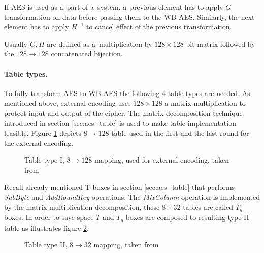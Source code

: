 \documentclass[11pt,oneside,final]{fithesis2}
\begin{document}
    If AES is used as a~part of a~system, a~previous element has to apply $G$ transformation on data before passing them to the WB AES. Similarly, the next element has to apply
    $H^{-1}$ to cancel effect of the previous transformation. 
    
    Usually $G, H$ are defined as a~multiplication by $128\times128$-bit matrix followed by the $128 \rightarrow 128$ concatenated bijection. 

    
    \paragraph*{Table types.} To fully transform AES to WB AES the following 4 table types are needed.
    As mentioned above, external encoding uses $128\times128$ a matrix multiplication to protect input and output of the cipher. 
    The matrix decomposition technique introduced in section \ref{sec:aes_table} is used to make table implementation feasible. Figure \ref{fig:aes_t1} depicts
    $8\rightarrow128$ table used in the first and the last round for the external encoding.

    \begin{figure}[!htb]
    \begin{center}
    \leavevmode
    \centerline{}
    \end{center}
    \caption{Table type I, $8\rightarrow128$ mapping, used for external encoding, taken from~\citep{wyseurPhd}}
    \label{fig:aes_t1}
    \end{figure}
    
    Recall already mentioned T-boxes in section \ref{sec:aes_table} that performs \emph{SubByte} and \emph{AddRoundKey} operations. The \emph{MixColumn} operation 
    is implemented by the matrix multiplication decomposition, these $8\times32$ tables are called $T_y$ boxes. In order to save space
    $T$ and $T_y$ boxes are composed to resulting type II table as illustrates figure \ref{fig:aes_t2}.

    \begin{figure}[!htb]
    \begin{center}
    \leavevmode
    \centerline{}
    \end{center}
    \caption{Table type II, $8\rightarrow32$ mapping, taken from~\citep{wyseurPhd}}
    \label{fig:aes_t2}
    \end{figure}
\end{document}

